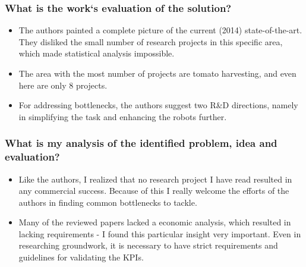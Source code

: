     \subsubsection*{What is the work`s evaluation of the solution?}
    \begin{itemize}
        \item The authors painted a complete picture of the current (2014) state-of-the-art. They disliked the small number of research projects in this specific area, which made statistical analysis impossible.
        \item The area with the most number of projects are tomato harvesting, and even here are only 8 projects. 
        \item For addressing bottlenecks, the authors suggest two R\&D directions, namely in simplifying the task and enhancing the robots further.
    \end{itemize}
    \subsubsection*{What is my analysis of the identified problem, idea and evaluation?}
    \begin{itemize}
        \item Like the authors, I realized that no research project I have read resulted in any commercial success. Because of this I really welcome the efforts of the authors in finding common bottlenecks to tackle. 
        \item Many of the reviewed papers lacked a economic analysis, which resulted in lacking requirements - I found this particular insight very important. Even in researching groundwork, it is necessary to have strict requirements and guidelines for validating the KPIs.
    \end{itemize}
